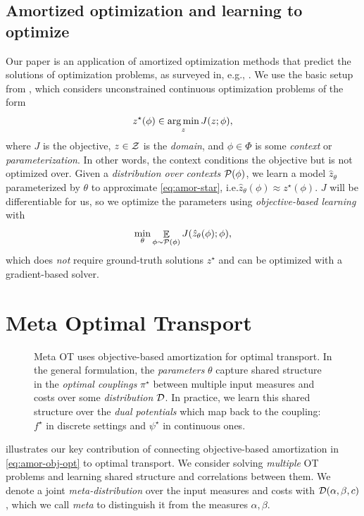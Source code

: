 \documentclass{article}
\newcommand{\eg}{e.g.\xspace}
\newcommand{\ie}{i.e.\xspace}
\begin{document}
\subsection{Amortized optimization and learning to optimize}
\label{sec:prelim:amor}
Our paper is an application of amortized optimization methods
that predict the solutions of optimization problems,
as surveyed in, \eg, \citet{chen2021learning,amos2022tutorial}.
We use the basic setup from \citet{amos2022tutorial},
which considers unconstrained continuous optimization problems of the form
\begin{equation}
  z^\star(\phi) \in \operatorname*{arg\,min}_z J(z; \phi),
  \label{eq:amor-star}
\end{equation}
where $J$ is the objective, $z\in{\mathcal{Z}}$ is the \emph{domain}, and
$\phi\in\Phi$ is some \emph{context} or \emph{parameterization}.
In other words, the context conditions the objective but
is not optimized over.
Given a \emph{distribution over contexts} ${\mathcal{P}}(\phi)$,
we learn a model $\hat z_\theta$ parameterized by $\theta$
to approximate \cref{eq:amor-star}, \ie $\hat z_\theta(\phi)\approx z^\star(\phi)$.
$J$ will be differentiable for us, so we optimize
the parameters using \emph{objective-based learning} with
\begin{equation}
  \min_\theta \mathop{\mathbb{E}}_{\phi\sim {\mathcal{P}}(\phi)} J(\hat z_\theta(\phi); \phi),
  \label{eq:amor-obj-opt}
\end{equation}
which does \emph{not} require ground-truth solutions $z^\star$
and can be optimized with a gradient-based solver.

\section{Meta Optimal Transport}
\label{sec:meta}
\begin{figure}[t]
  \centering
  
  \caption{
    Meta OT uses objective-based amortization for optimal transport.
    In the general formulation, the \emph{parameters} $\theta$ capture
    shared structure in the \emph{optimal couplings} $\pi^\star$ between
    multiple input measures and costs over some \emph{distribution} ${\mathcal{D}}$.
    In practice, we learn this shared structure over the
    \emph{dual potentials} which map back to the coupling:
    $f^\star$ in discrete settings and $\psi^\star$ in continuous ones.
  }
  \label{fig:meta-OT}
\end{figure}

 illustrates our key contribution of connecting
objective-based amortization in \cref{eq:amor-obj-opt} to
optimal transport. We consider solving \emph{multiple} OT problems
and learning shared structure and correlations between them.
We denote a joint \emph{meta-distribution} over the input
measures and costs with ${\mathcal{D}}(\alpha,\beta,c)$, which we call \emph{meta}
to distinguish it from the measures $\alpha,\beta$.
\end{document}
